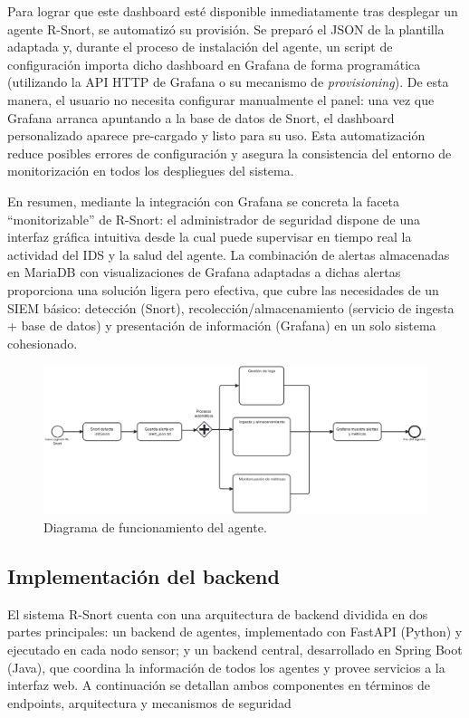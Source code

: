 \documentclass[11pt,a4paper,twoside]{report}
\begin{document}
Para lograr que este dashboard esté disponible inmediatamente tras desplegar un agente R-Snort, se automatizó su provisión. Se preparó el JSON de la plantilla adaptada y, durante el proceso de instalación del agente, un script de configuración importa dicho dashboard en Grafana de forma programática (utilizando la API HTTP de Grafana o su mecanismo de \textit{provisioning}). De esta manera, el usuario no necesita configurar manualmente el panel: una vez que Grafana arranca apuntando a la base de datos de Snort, el dashboard personalizado aparece pre-cargado y listo para su uso. Esta automatización reduce posibles errores de configuración y asegura la consistencia del entorno de monitorización en todos los despliegues del sistema.\newline

En resumen, mediante la integración con Grafana se concreta la faceta “monitorizable” de R-Snort: el administrador de seguridad dispone de una interfaz gráfica intuitiva desde la cual puede supervisar en tiempo real la actividad del IDS y la salud del agente. La combinación de alertas almacenadas en MariaDB con visualizaciones de Grafana adaptadas a dichas alertas proporciona una solución ligera pero efectiva, que cubre las necesidades de un SIEM básico: detección (Snort), recolección/almacenamiento (servicio de ingesta + base de datos) y presentación de información (Grafana) en un solo sistema cohesionado.

\begin{figure}[htb]
	\centering
	\includegraphics[width=1\textwidth]{documento/26.png}
	\caption{Diagrama de funcionamiento del agente.}
	\label{fig:agent-bpmn}
\end{figure}

\subsection{Implementación del backend}

El sistema R-Snort cuenta con una arquitectura de backend dividida en dos partes principales: un backend de agentes, implementado con FastAPI (Python) y ejecutado en cada nodo sensor; y un backend central, desarrollado en Spring Boot (Java), que coordina la información de todos los agentes y provee servicios a la interfaz web. A continuación se detallan ambos componentes en términos de endpoints, arquitectura y mecanismos de seguridad
\end{document}
